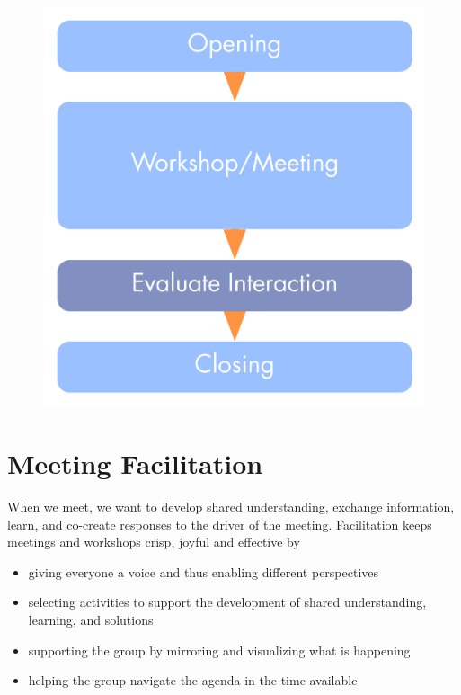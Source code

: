 \begin{figure}[htbp]
\centering
\includegraphics[keepaspectratio,width=\textwidth,height=0.75\textheight]{img/meetings/evaluate-interactions.png}
\end{figure}

\section{Meeting Facilitation}
\label{meetingfacilitation}

When we meet, we want to develop shared understanding, exchange information, learn, and co-create responses to the driver of the meeting. Facilitation keeps meetings and workshops crisp, joyful and effective by

\begin{itemize}
\item giving everyone a voice and thus enabling different perspectives

\item selecting activities to support the development of shared understanding, learning, and solutions

\item supporting the group by mirroring and visualizing what is happening

\item helping the group navigate the agenda in the time available

\end{itemize}

